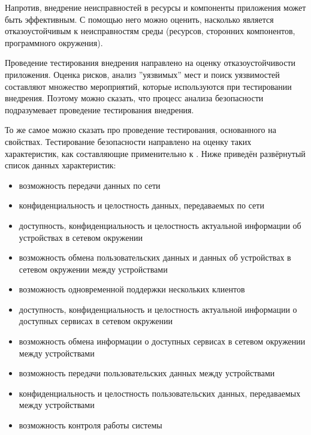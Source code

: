 %
Напротив, внедрение неисправностей в ресурсы и компоненты приложения может быть эффективным. 
%
С помощью него можно оценить, насколько \PeerHood является отказоустойчивым к неисправностям среды (ресурсов, сторонних компонентов, программного окружения). 

%
Проведение тестирования внедрения направлено на оценку отказоустойчивости приложения. 
%
Оценка рисков, анализ ''уязвимых'' мест и поиск уязвимостей составляют множество мероприятий, которые используются при тестировании внедрения. 
%
Поэтому можно сказать, что процесс анализа безопасности \PeerHood подразумевает проведение тестирования внедрения. 

%
То же самое можно сказать про проведение тестирования, основанного на свойствах. 
%
Тестирование безопасности \PeerHood направлено на оценку таких характеристик, как составляющие \CIATriad применительно к \PeerHood. Ниже приведён развёрнутый список данных характеристик:
\begin{itemize}
	\setlength{\itemsep}{0pt}%

	\item возможность передачи данных по сети
	\item конфиденциальность и целостность данных, передаваемых по сети

	\item доступность, конфиденциальность и целостность актуальной информации об устройствах в сетевом окружении
	\item возможность обмена пользовательских данных и данных об устройствах в сетевом окружении между устройствами
	\item возможность одновременной поддержки нескольких клиентов

	\item доступность, конфиденциальность и целостность актуальной информации о доступных сервисах в сетевом окружении
	\item возможность обмена информации о доступных сервисах в сетевом окружении между устройствами

	\item возможность передачи пользовательских данных между устройствами
	\item конфиденциальность и целостность пользовательских данных, передаваемых между устройствами
	\item возможность контроля работы системы
\end{itemize}


